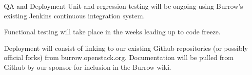 \documentclass{beamer}
\begin{document}
\begin{frame}{QA and Deployment}
  Unit and regression testing will be ongoing using Burrow's existing Jenkins continuous integration system.
  
  Functional testing will take place in the weeks leading up to code freeze.

  Deployment will consist of linking to our existing Github repositories (or possibly official forks)
  from burrow.openstack.org.  Documentation will be pulled from Github by our sponsor for inclusion in the Burrow wiki.
\end{frame}
\end{document}
